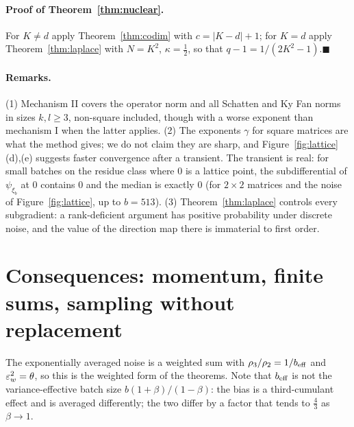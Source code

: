 \documentclass[anon,12pt]{colt2026}
\begin{document}
\paragraph{Proof of Theorem~\ref{thm:nuclear}.} For $K\ne d$ apply Theorem~\ref{thm:codim} with $c=|K-d|+1$; for
$K=d$ apply Theorem~\ref{thm:laplace} with $N=K^2$, $\kappa=\frac12$, so that $q-1=1/(2K^2-1)$.\hfill$\blacksquare$

\paragraph{Remarks.} (1) Mechanism II covers the operator norm and all Schatten and Ky Fan norms in sizes
$k,l\ge3$, non-square included, though with a worse exponent than mechanism I when the latter applies.
(2) The exponents $\gamma$ for square matrices are what the method gives; we do not claim they are sharp, and
Figure~\ref{fig:lattice}(d),(e) suggests faster convergence after a transient. The transient is real: for small batches
on the residue class where $0$ is a lattice point, the subdifferential of $\psi_{\xi_b}$ at $0$ contains $0$ and the
median is exactly $0$ (for $2\times2$ matrices and the noise of Figure~\ref{fig:lattice}, up to $b=513$).
(3) Theorem~\ref{thm:laplace} controls every subgradient: a rank-deficient argument has positive probability under
discrete noise, and the value of the direction map there is immaterial to first order.

\section{Consequences: momentum, finite sums, sampling without replacement}\label{sec:cons}

\begin{corollary}\label{cor:mom}\StmtMomCor\end{corollary}

The exponentially averaged noise is a weighted sum with $\rho_3/\rho_2=1/b_{\mathrm{eff}}$ and $\varepsilon_w^2=\theta$, so this is the
weighted form of the theorems. Note that $b_{\mathrm{eff}}$ is not the variance-effective batch size $b(1+\beta)/(1-\beta)$: the
bias is a third-cumulant effect and is averaged differently; the two differ by a factor that tends to $\frac43$ as
$\beta\to1$.

\begin{corollary}\label{cor:fs}\StmtFS\end{corollary}
\end{document}
